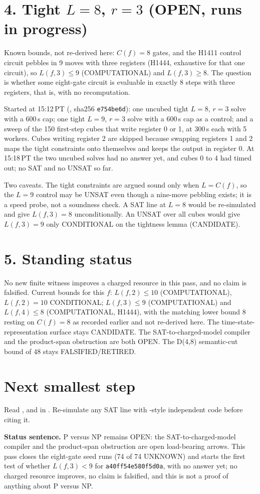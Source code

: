 \documentclass[11pt]{article}
\begin{document}
\section*{4. Tight $L=8$, $r=3$ (OPEN, runs in progress)}
Known bounds, not re-derived here: $C(f)=8$ gates, and the H1411 control circuit pebbles in 9 moves with three registers (H1444, exhaustive for that one circuit), so $L(f,3)\le 9$ (COMPUTATIONAL) and $L(f,3)\ge 8$. The question is whether some eight-gate circuit is evaluable in exactly 8 steps with three registers, that is, with no recomputation.

Started at 15:12\,PT (, sha256 \texttt{e754be6d}): one uncubed tight $L=8$, $r=3$ solve with a 600\,s cap; one tight $L=9$, $r=3$ solve with a 600\,s cap as a control; and a sweep of the 150 first-step cubes that write register 0 or 1, at 300\,s each with 5 workers. Cubes writing register 2 are skipped because swapping registers 1 and 2 maps the tight constraints onto themselves and keeps the output in register 0. At 15:18\,PT the two uncubed solves had no answer yet, and cubes 0 to 4 had timed out; no SAT and no UNSAT so far.

Two caveats. The tight constraints are argued sound only when $L=C(f)$, so the $L=9$ control may be UNSAT even though a nine-move pebbling exists; it is a speed probe, not a soundness check. A SAT line at $L=8$ would be re-simulated and give $L(f,3)=8$ unconditionally. An UNSAT over all cubes would give $L(f,3)=9$ only CONDITIONAL on the tightness lemma (CANDIDATE).

\section*{5. Standing status}
No new finite witness improves a charged resource in this pass, and no claim is falsified. Current bounds for this $f$: $L(f,2)\le 10$ (COMPUTATIONAL), $L(f,2)=10$ CONDITIONAL; $L(f,3)\le 9$ (COMPUTATIONAL) and $L(f,4)\le 8$ (COMPUTATIONAL, H1444), with the matching lower bound 8 resting on $C(f)=8$ as recorded earlier and not re-derived here. The time-state-representation surface stays CANDIDATE. The SAT-to-charged-model compiler and the product-span obstruction are both OPEN. The D(4,8) semantic-cut bound of 48 stays FALSIFIED/RETIRED.

\section*{Next smallest step}
Read ,  and  in . Re-simulate any SAT line with -style independent code before citing it.

\bigskip
\noindent\textbf{Status sentence.} P versus NP remains OPEN: the SAT-to-charged-model compiler and the product-span obstruction are open load-bearing arrows. This pass closes the eight-gate seed runs (74 of 74 UNKNOWN) and starts the first test of whether $L(f,3)<9$ for \texttt{a40ff54e580f5d0a}, with no answer yet; no charged resource improves, no claim is falsified, and this is not a proof of anything about P versus NP.
\end{document}
